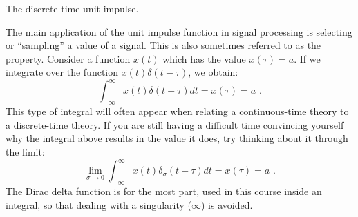 \begin{marginfigure}
  \begin{center}
  \end{center}
  \caption{The discrete-time unit impulse.}
  \label{fig:udensdisc}
\end{marginfigure}

The main application of the unit impulse function in signal processing is 
selecting or ``sampling'' a value of a signal. This is also sometimes referred to 
as the \emph{} property. Consider a function $x(t)$ which 
has the value $x(\tau) = a$. If we integrate over the function $x(t)\delta(t-\tau)$, 
we obtain:
\begin{equation}
  \int_{-\infty}^{\infty}x(t)\delta(t-\tau) dt = x(\tau) = a\,\,.
\end{equation}
This type of integral will often appear when relating a continuous-time theory to a discrete-time theory.
If you are still having a difficult time convincing yourself why the integral above results 
in the value it does, try thinking about it through the limit:
\begin{equation}
  \lim_{\sigma\rightarrow 0}\int_{-\infty}^{\infty}x(t)\delta_{\sigma}(t-\tau) dt = x(\tau) = a\,\,.
\end{equation}
The Dirac delta function is for the most part, used in this course inside an integral, 
so that dealing with a singularity ($\infty$) is avoided.

